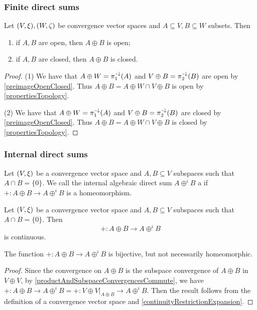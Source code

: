 \subsubsection{Finite direct sums}
\begin{lemma} \label{directSumsOpenClosedSets}
Let $\sSet{V,\xi}, \sSet{W,\zeta}$ be convergence vector spaces and $A\subseteq V, B\subseteq W$ subsets. Then
\begin{enumerate}
\item if $A,B$ are open, then $A\oplus B$ is open;
\item if $A,B$ are closed, then $A\oplus B$ is closed.
\end{enumerate}
\end{lemma}
\begin{proof}
(1) We have that $A\oplus W = \pi_1^{{\text{\hspace{0.15em}-}\downarrow}}(A)$ and $V\oplus B = \pi_2^{{\text{\hspace{0.15em}-}\downarrow}}(B)$ are open by \ref{preimageOpenClosed}. Thus $A\oplus B = A\oplus W \cap V\oplus B$ is open by \ref{propertiesTopology}.

(2) We have that $A\oplus W = \pi_1^{{\text{\hspace{0.15em}-}\downarrow}}(A)$ and $V\oplus B = \pi_2^{{\text{\hspace{0.15em}-}\downarrow}}(B)$ are closed by \ref{preimageOpenClosed}. Thus $A\oplus B = A\oplus W \cap V\oplus B$ is closed by \ref{propertiesTopology}.
\end{proof}

\subsubsection{Internal direct sums}
\begin{definition}
Let $\sSet{V,\xi}$ be a convergence vector space and $A,B\subseteq V$ subspaces such that $A\cap B = \{0\}$. We call the internal algebraic direct sum $A\oplus^i B$ a  if $+: A\oplus B \to A\oplus^i B$ is a homeomorphism.
\end{definition}

\begin{lemma} \label{sumOnDirectSumsContinuous}
Let $\sSet{V,\xi}$ be a convergence vector space and $A,B\subseteq V$ subspaces such that $A\cap B = \{0\}$. Then
\[ +: A\oplus B \to A\oplus^i B \]
is continuous.
\end{lemma}
The function $+: A\oplus B \to A\oplus^i B$ is bijective, but not necessarily homeomorphic.
\begin{proof}
Since the convergence on $A\oplus B$ is the subspace convergence of $A\oplus B$ in $V\oplus V$, by \ref{productAndSubspaceConvergencesCommute},
we have $+: A\oplus B \to A\oplus^i B = +: V\oplus V|_{A\oplus B} \to A\oplus^i B$.
Then the result follows from the definition of a convergence vector space and \ref{continuityRestrictionExpansion}.
\end{proof}

